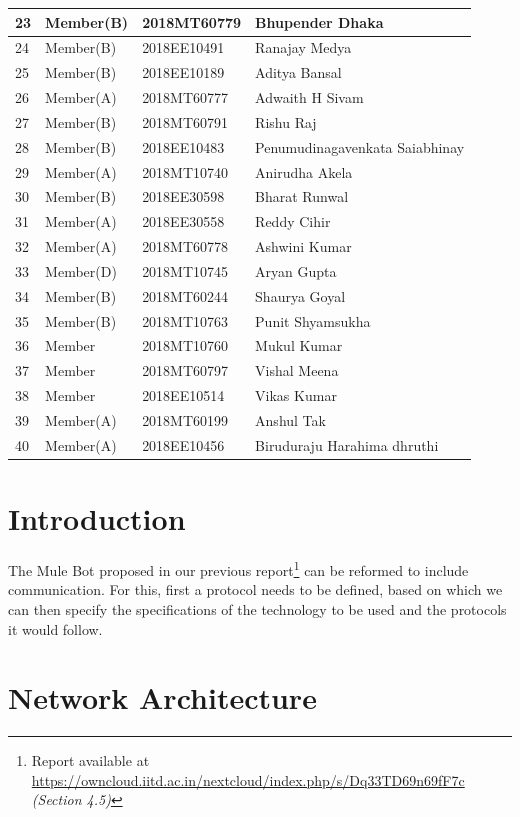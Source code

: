\documentclass{article}
\newcommand{\eat}[1]{} %
\begin{document}
\begin{tabular}{ |p{0.7cm}|p{5cm}|p{3.1cm}|p{6cm}|  }
23 & Member(B) & 2018MT60779 & Bhupender Dhaka \\ \hline
24 & Member(B) & 2018EE10491 & Ranajay Medya \\ \hline
25 & Member(B) & 2018EE10189 & Aditya Bansal \\ \hline
26 & Member(A) & 2018MT60777 & Adwaith H Sivam \\ \hline
27 & Member(B) & 2018MT60791 & Rishu Raj \\ \hline
28 & Member(B) & 2018EE10483 & Penumudinagavenkata Saiabhinay \\ \hline
29 & Member(A) & 2018MT10740 & Anirudha Akela \\ \hline
30 & Member(B) & 2018EE30598 & Bharat Runwal \\ \hline
31 & Member(A) & 2018EE30558 & Reddy Cihir \\ \hline
32 & Member(A)	& 2018MT60778 &	Ashwini Kumar \\ \hline
33 & Member(D)	& 2018MT10745 & Aryan Gupta \\ \hline
34 & Member(B)	& 2018MT60244 & Shaurya Goyal \\ \hline
35 & Member(B)	& 2018MT10763 & Punit Shyamsukha \\ \hline
36 & Member	& 2018MT10760 & Mukul Kumar \\ \hline
37 & Member	& 2018MT60797 & Vishal Meena \\ \hline
38 & Member	& 2018EE10514 & Vikas Kumar \\ \hline
39 & Member(A)	& 2018MT60199 & Anshul Tak \\ \hline
40 & Member(A)	& 2018EE10456 & Biruduraju Harahima dhruthi  \\ \hline
\end{tabular}
\newpage
 \tableofcontents
\newpage

\section{Introduction}
The Mule Bot proposed in our previous report\footnote{Report available at  \url{https://owncloud.iitd.ac.in/nextcloud/index.php/s/Dq33TD69n69fF7c} \textit{(Section 4.5)}} can be reformed to include communication\eat{( As said in Sec 4.5 Point 6)}. For this, first a protocol needs to be defined, based on which we can then specify the specifications of the technology to be used and the protocols it would follow.

\section{Network Architecture}
\end{document}
